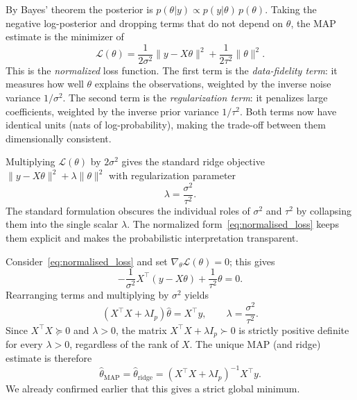 By Bayes' theorem the posterior is
$p(\theta | y) \propto p(y | \theta)\,p(\theta)$.
Taking the negative log-posterior and dropping terms that do not depend on
$\theta$, the MAP estimate is the minimizer of
\begin{equation} \label{eq:normalised_loss} 
\mathcal{L}(\theta)
  = \frac{1}{2\sigma^2}\|y - X\theta\|^2
  + \frac{1}{2\tau^2}\|\theta\|^2.
\end{equation}
This is the \emph{normalized} loss function.  The first term is the
\emph{data-fidelity term}: it measures how well $\theta$ explains the
observations, weighted by the inverse noise variance $1/\sigma^2$.  The second
term is the \emph{regularization term}: it penalizes large coefficients,
weighted by the inverse prior variance $1/\tau^2$.  Both terms now have
identical units (nats of log-probability), making the trade-off between them
dimensionally consistent.

\begin{remark}
Multiplying $\mathcal{L}(\theta)$ by $2\sigma^2$ gives the standard
ridge objective $\|y - X\theta\|^2 + \lambda\|\theta\|^2$ with regularization
parameter
\begin{equation}
  \label{eq:lambda_sigma_tau}
  \lambda = \frac{\sigma^2}{\tau^2}.
\end{equation}
The standard formulation obscures the individual roles of $\sigma^2$ and
$\tau^2$ by collapsing them into the single scalar $\lambda$.  The normalized
form~\eqref{eq:normalised_loss} keeps them explicit and makes the probabilistic
interpretation transparent.
\end{remark}



Consider~\eqref{eq:normalised_loss} and
set $\nabla_\theta \mathcal{L}(\theta) = 0$; this gives
\begin{equation}
  \label{eq:gradient}
  -\frac{1}{\sigma^2}X^\top(y - X\theta) + \frac{1}{\tau^2}\theta = 0.
\end{equation}
Rearranging terms and multiplying  by $\sigma^2$ yields
\begin{equation}
  \label{eq:ridge_normal1}
  \left(X^\top X + \lambda I_p\right)\hat\theta = X^\top y,
  \qquad \lambda = \frac{\sigma^2}{\tau^2}.
\end{equation}
Since $X^\top X \succeq 0$ and $\lambda > 0$, the matrix
$X^\top X + \lambda I_p \succ 0$ is strictly positive definite for every
$\lambda > 0$, regardless of the rank of $X$.  The unique MAP (and ridge)
estimate is therefore
\begin{equation}
  \label{eq:ridge_estimate}
  \hat\theta_{\mathrm{MAP}}
  = \hat\theta_{\mathrm{ridge}}
  = \left(X^\top X + \lambda I_p\right)^{-1}X^\top y.
\end{equation}
We already confirmed earlier that this gives a strict global minimum.

